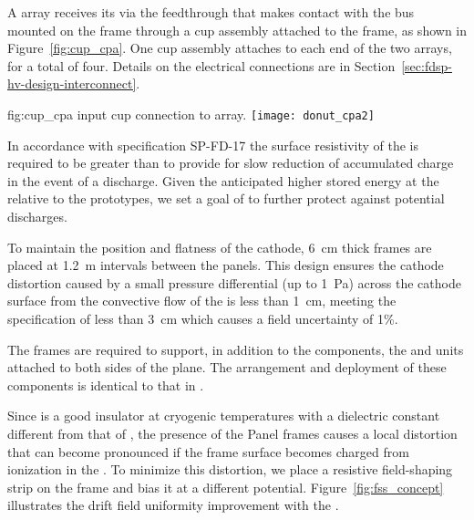 A  array receives its  via the feedthrough that makes contact with the  bus mounted on the  frame through a cup assembly attached to the frame, as shown in Figure~\ref{fig:cup_cpa}. 
One cup assembly attaches to each end of the two  arrays, for a total of four. Details on the electrical connections are in Section~\ref{sec:fdsp-hv-design-interconnect}.

\begin{dunefigure}{fig:cup_cpa}{ input cup connection to  array.}
\texttt{[image: donut\_cpa2]} %
\end{dunefigure}

In accordance with specification SP-FD-17 %
the surface resistivity of the  is required to be greater than \cathodemegohm to provide for slow reduction of accumulated charge in the event of a discharge.  Given the anticipated higher stored energy at the  
relative to the prototypes, we set a goal of \cathodegigohm to further  protect against potential discharges.  
 
To maintain the position and flatness of the cathode, 
\SI{6}{cm} thick \frfour frames are placed at \SI{1.2}{m} intervals between the  panels. This design ensures the cathode distortion caused by a small pressure differential (up to \SI{1}{Pa}) across the cathode surface from the convective flow of the \lar is less than \SI{1}{cm}, meeting the specification of less than \SI{3}{cm} which causes a field uncertainty of 1\%.


The  frames are required to support, in addition to the  components, the  and  units attached to both sides of the  plane. %
The arrangement and deployment of these components is identical to that in .  

 Since \frfour is a good insulator at cryogenic temperatures with a dielectric constant different from that of \lar, the presence of the  Panel frames causes a local \efield distortion that can become pronounced if the frame surface becomes charged 
from ionization in the .  To minimize this distortion, we place a resistive field-shaping strip  on the frame and bias it at a different potential.  Figure~\ref{fig:fss_concept} illustrates the drift field uniformity improvement with the .


